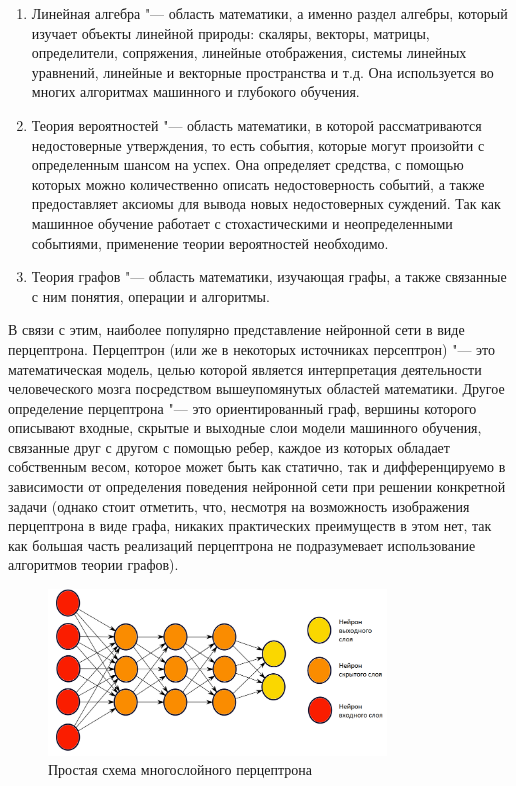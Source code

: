 \documentclass[bachelor, och, coursework]{SCWorks}
\begin{document}
            \begin{enumerate}
                \item Линейная алгебра "--- область математики, а именно раздел алгебры, который изучает объекты линейной природы: скаляры, векторы, матрицы, определители, сопряжения, линейные отображения, системы линейных уравнений, линейные и векторные пространства и т.д. Она используется во многих алгоритмах машинного и глубокого обучения.
                \item Теория вероятностей "--- область математики, в которой рассматриваются недостоверные утверждения, то есть события, которые могут произойти с определенным шансом на успех. Она определяет средства, с помощью которых можно количественно описать недостоверность событий, а также предоставляет аксиомы для вывода новых недостоверных суждений. Так как машинное обучение работает с стохастическими и неопределенными событиями, применение теории вероятностей необходимо.
                \item Теория графов "--- область математики, изучающая графы, а также связанные с ним понятия, операции и алгоритмы.
            \end{enumerate}
            
            В связи с этим, наиболее популярно представление нейронной сети в виде перцептрона. Перцептрон (или же в некоторых источниках персептрон) "--- это математическая модель, целью которой является интерпретация деятельности человеческого мозга посредством вышеупомянутых областей математики. Другое определение перцептрона "--- это ориентированный граф, вершины которого описывают входные, скрытые и выходные слои модели машинного обучения, связанные друг с другом с помощью ребер, каждое из которых обладает собственным весом, которое может быть как статично, так и дифференцируемо в зависимости от определения поведения нейронной сети при решении конкретной задачи (однако стоит отметить, что, несмотря на возможность изображения перцептрона в виде графа, никаких практических преимуществ в этом нет, так как большая часть реализаций перцептрона не подразумевает использование алгоритмов теории графов).
            
            \begin{figure}[H]
                \centering
                \includegraphics[width=0.8\textwidth]{pic/perceptron.png}
                \caption{Простая схема многослойного перцептрона}
                \label{fig:img2}
            \end{figure}
\end{document}
